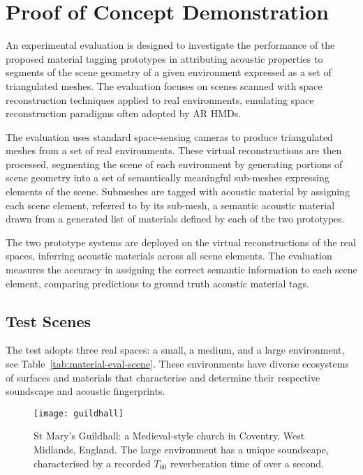 \section{Proof of Concept Demonstration}
An experimental evaluation is designed to investigate the performance of the proposed material tagging prototypes in attributing acoustic properties to segments of the scene geometry of a given environment expressed as a set of triangulated meshes. The evaluation focuses on scenes scanned with space reconstruction techniques applied to real environments, emulating space reconstruction paradigms often adopted by AR HMDs. \par
The evaluation uses standard space-sensing cameras to produce triangulated meshes from a set of real environments. These virtual reconstructions are then processed, segmenting the scene of each environment by generating portions of scene geometry into a set of semantically meaningful sub-meshes expressing elements of the scene. Submeshes are tagged with acoustic material by assigning each scene element, referred to by its sub-mesh, a semantic acoustic material drawn from a generated list of materials defined by each of the two prototypes. \par
The two prototype systems are deployed on the virtual reconstructions of the real spaces, inferring acoustic materials across all scene elements. The evaluation measures the accuracy in assigning the correct semantic information to each scene element, comparing predictions to ground truth acoustic material tags.

\subsection{Test Scenes}
The test adopts three real spaces: a small, a medium, and a large environment, see Table~\ref{tab:material-eval-scene}. These environments have diverse ecosystems of surfaces and materials that characterise and determine their respective soundscape and acoustic fingerprints.

\begin{figure}[htbp]
    \centering
    \texttt{[image: guildhall]}
    \caption{St Mary's Guildhall: a Medieval-style church in Coventry, West Midlands, England. The large environment has a unique soundscape, characterised by a recorded $T_{60}$ reverberation time of over a second.}
    \label{fig:guildhall-iso-render}
\end{figure}


